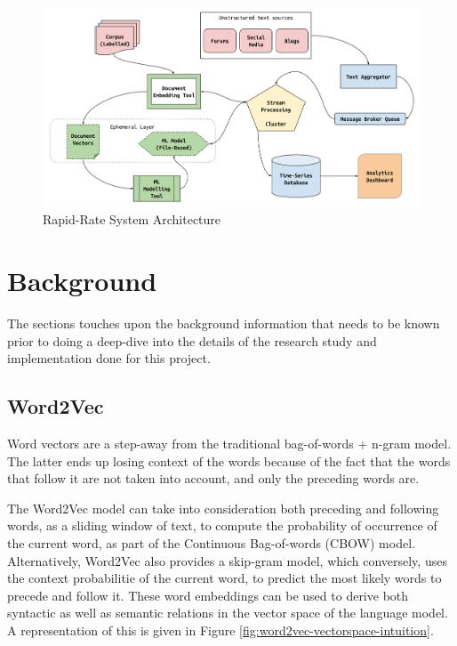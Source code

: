 \documentclass[conference]{IEEEtran}
\begin{document}
\vspace{5mm}

\begin{figure}[ht]
    \centering
    \includegraphics[width=\textwidth]{images/rapid_rate_system_arch_1.png}
    \caption{Rapid-Rate System Architecture}
    \label{fig:system-architecture}
\end{figure}

\section{Background}
    The sections touches upon the background information that needs to be known prior to doing a deep-dive into the details of the research study and implementation done for this project.

    \subsection{Word2Vec} \label{Word2Vec}
        Word vectors are a step-away from the traditional bag-of-words + n-gram model. 
        The latter ends up losing context of the words because of the fact that the words that follow it are not taken into account, and only the preceding words are.

        The Word2Vec model\cite{mikolov2013efficient} can take into consideration both preceding and following words, as a sliding window of text, to compute the probability of occurrence of the current word, as part of the Continuous Bag-of-words (CBOW) model. 
        Alternatively, Word2Vec also provides a skip-gram model\cite{mikolov2013distributed}, which conversely, uses the context probabilitie of the current word, to predict the most likely words to precede and follow it. 
        These word embeddings can be used to derive both syntactic as well as semantic relations in the vector space of the language model. A representation of this is given in Figure \ref{fig:word2vec-vectorspace-intuition}.
\end{document}
